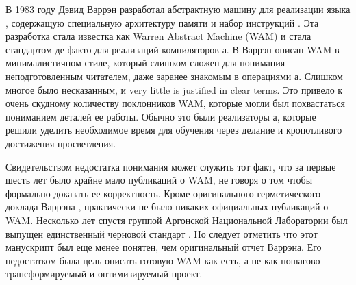 \secdown

В 1983 году Дэвид Варрэн разработал абстрактную машину для реализации языка
\prolog, содержащую специальную архитектуру памяти и набор инструкций
\cite{War83}. Эта разработка стала известка как Warren Abstract Machine (WAM)
и стала стандартом де-факто для реализаций компиляторов \prolog а. В
\cite{War83} Варрэн описан WAM в минималистичном стиле, который слишком сложен
для понимания неподготовленным читателем, даже заранее знакомым в операциями
\prolog а. Слишком многое было несказанным, и very little is justified in clear
terms. Это привело к очень скудному количеству
поклонников WAM, которые могли был похвастаться пониманием деталей ее работы.
Обычно это были реализаторы \prolog а, которые решили уделить необходимое время
для обучения через делание и кропотливого достижения просветления.


Свидетельством недостатка понимания может служить тот факт, что за первые шесть
лет было крайне мало публикаций о WAM, не говоря о том чтобы формально доказать
ее корректность. Кроме оригинального герметического доклада Варрэна
\cite{War83}, практически не было никаких официальных публикаций о WAM.
Несколько лет спустя группой Аргонской Национальной Лаборатории был выпущен
единственный черновой стандарт \cite{GLLO85}. Но следует отметить что этот
манускрипт был еще менее понятен, чем оригинальный отчет Варрэна. Его
недостатком была цель описать готовую WAM как есть, а не как пошагово
трансформируемый и оптимизируемый проект.

